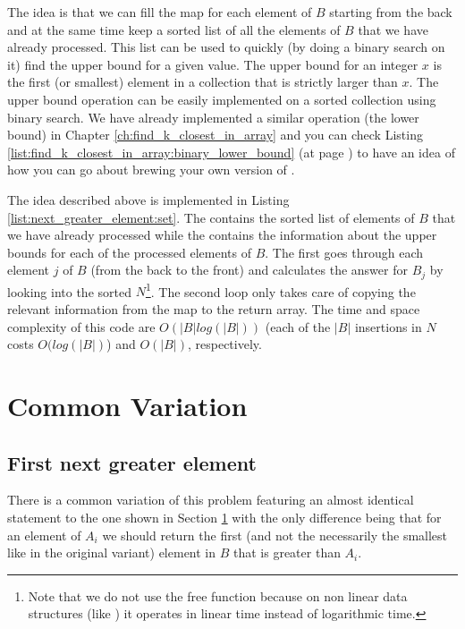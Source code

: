The idea is that we can fill the map for each element of $B$ starting from the back and at the same
time keep a sorted list of all the elements of $B$ that we have already processed. This list can be
used to quickly (by doing a binary search on it) find the upper bound for a given value. The upper
bound for an integer $x$ is the first (or smallest) element in a collection that is strictly larger
than $x$. The upper bound operation can be easily implemented on a sorted collection using binary
search. We have already implemented a similar operation (the lower bound) in Chapter
\ref{ch:find_k_closest_in_array} and you can check Listing
\ref{list:find_k_closest_in_array:binary_lower_bound} (at page
\pageref{list:find_k_closest_in_array:binary_lower_bound}) to have an idea of how you can go about
brewing  your own version of .


The idea described above is implemented in Listing \ref{list:next_greater_element:set}. The
 contains the sorted list of elements of $B$ that we have already processed
while the  contains the information about the upper bounds
for each of the processed elements of $B$. The first  goes through each element $j$ of
$B$ (from the back to the front) and calculates the answer for $B_j$ by looking into the sorted
 $N$\footnote{Note that we do not use the free function
\href{https://en.cppreference.com/w/cpp/algorithm/upper_bound}{} because on
non linear data structures (like ) it operates in linear time instead of
logarithmic time.}. The second  loop only takes care of copying the relevant information
from the map  to the return array. The time and space complexity of this code are
$O(|B|log(|B|))$ (each of the $|B|$ insertions in $N$ costs $O(log(|B|)$) and $O(|B|)$,
respectively.



\section{Common Variation}
\subsection{First next greater element}
\label{next_greater_element:sec:first}
There is a common variation of this problem featuring an almost identical statement to the one shown
in Section \ref{} with the only difference being that for an element of $A_i$ we should return the
first (and not the necessarily the smallest like in the original variant) element in $B$ that is
greater than $A_i$.

